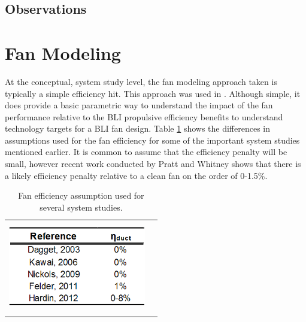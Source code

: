 \documentclass[12pt]{gatech-thesis}
\begin{document}
\subsection{Observations}

\section{Fan Modeling}
\indent At the conceptual, system study level, the fan modeling approach taken is typically a simple efficiency hit.  This approach was used in \cite{Felder2011} \cite{Sato2011} \cite{Hardin2012} \cite{Nickol2009}  .  Although simple, it does provide a basic parametric way to understand the impact of the fan performance relative to the BLI propulsive efficiency benefits to understand technology targets for a BLI fan design.  Table \ref{Fan_Efficiency_Assumptions} shows the differences in assumptions used for the fan efficiency for some of the important system studies mentioned earlier.  It is common to assume that the efficiency penalty will be small, however recent work conducted by Pratt and Whitney \cite{Florea2013} shows that there is a likely efficiency penalty relative to a clean fan on the order of 0-1.5\%.  

\begin{table}[ht]
\caption{Fan efficiency assumption used for several system studies.}
\centering
\begin{tabular}{cc}
\includegraphics[width=60mm, height =40mm, clip=true, trim = 0mm 0mm 0mm 0mm]{Fan_Efficiency_Assumptions.png}
\end{tabular}
\label{Fan_Efficiency_Assumptions}
\end{table}
\end{document}
